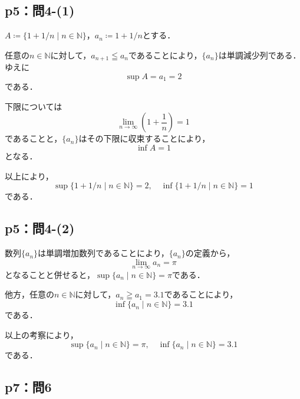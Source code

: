 \documentclass[uplatex,dvipdfmx,a4paper,10pt,fleqn]{jsarticle}
\newenvironment{tleftbar}{\begin{tbleftline}\setlength{\parindent}{1zw}}{\end{tbleftline}}
\begin{document}
    \subsection*{p5：問4-(1)}

    \begin{tleftbar}
        $A \coloneqq \{ 1 + 1/n \mid n \in \mathbb{N} \}$，$ a_n \coloneqq 1+1/n$とする．

        任意の$n \in \mathbb{N}$に対して，$a_{n+1} \leqq a_n$であることにより，$\{ a_n \}$は単調減少列である．ゆえに
        \[
            \sup A = a_1 = 2
        \]
        である．
        
        下限については
        \[
            \lim_{n \to \infty} \left ( 1 + \frac{1}{n} \right) = 1
        \]
        であることと，$\{ a_n \}$はその下限に収束することにより，
        \[
            \inf A = 1 
        \]
        となる．
        
        以上により，
        \[
            \sup \{ 1 + 1/n \mid n \in \mathbb{N} \} = 2 , \quad \inf \{ 1 + 1/n \mid n \in \mathbb{N} \}=1
        \]
        である．
    \end{tleftbar}


    \subsection*{p5：問4-(2)}

    \begin{tleftbar}
        数列$\{ a_n \}$は単調増加数列であることにより，$\{ a_n \}$の定義から，
        \[
            \lim_{n \to \infty} a_n = \pi 
        \]
        となることと併せると，$\sup \{ a_n \mid n \in \mathbb{N} \} = \pi$である．
        
        他方，任意の$n \in \mathbb{N}$に対して，$ a_n \geqq a_1 = 3.1$であることにより，
        \[
            \inf \{ a_n \mid n \in \mathbb{N} \} =3.1
        \]
        である．

        以上の考察により，
        \[
            \sup \{ a_n \mid n \in \mathbb{N} \} = \pi,\quad    \inf \{ a_n \mid n \in \mathbb{N} \} =3.1
        \]
        である．
    \end{tleftbar}




    \subsection*{p7：問6}
\end{document}
